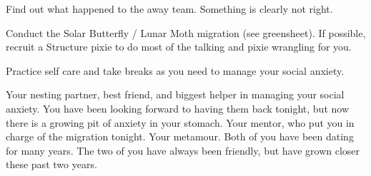 \documentclass[char]{PP}
\begin{document}
\begin{itemz}
	\item Find out what happened to the away team. Something is clearly not right.
	\item Conduct the Solar Butterfly / Lunar Moth migration (see greensheet). If possible, recruit a Structure pixie to do most of the talking and pixie wrangling for you.
	\item Practice self care and take breaks as you need to manage your social anxiety.
\end{itemz}

\begin{itemz}[Notes]
	\item 
\end{itemz}

\begin{contacts}
	\contact{\cFLost{}} Your nesting partner, best friend, and biggest helper in managing your social anxiety. You have been looking forward to having them back tonight, but now there is a growing pit of anxiety in your stomach.
	\contact{\cFHead{}} Your mentor, who put you in charge of the migration tonight.
	\contact{\cMHead{}} Your metamour. Both of you have been dating \cFLost{} for many years. The two of you have always been friendly, but have grown closer these past two years.
\end{contacts}
\end{document}
